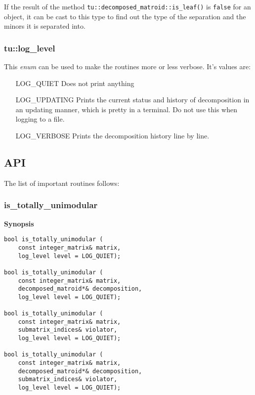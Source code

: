 \documentclass[12pt]{article}
\begin{document}
If the result of the method {\tt tu::decomposed\_matroid::is\_leaf()} is {\tt false} for an object, it can be cast
to this type to find out the type of the separation and the minors it is separated into.

\subsubsection{tu::log\_level}

This {\em enum} can be used to make the routines more or less verbose. It's values are:
\begin{itemize}
\item[LOG\_QUIET]
  Does not print anything
\item[LOG\_UPDATING]
  Prints the current status and history of decomposition in an updating manner, which is pretty in a terminal. Do not use this when logging to a file.
\item[LOG\_VERBOSE]
  Prints the decomposition history line by line.
\end{itemize}

\newpage

\subsection{API}

The list of important routines follows:

\subsubsection{is\_totally\_unimodular}

{\bf Synopsis} 

{\tiny
{}
\begin{lstlisting}
bool is_totally_unimodular (
    const integer_matrix& matrix,
    log_level level = LOG_QUIET);

bool is_totally_unimodular (
    const integer_matrix& matrix,
    decomposed_matroid*& decomposition,
    log_level level = LOG_QUIET);

bool is_totally_unimodular (
    const integer_matrix& matrix,
    submatrix_indices& violator,
    log_level level = LOG_QUIET);

bool is_totally_unimodular (
    const integer_matrix& matrix,
    decomposed_matroid*& decomposition,
    submatrix_indices& violator,
    log_level level = LOG_QUIET);
\end{lstlisting}}
\end{document}
